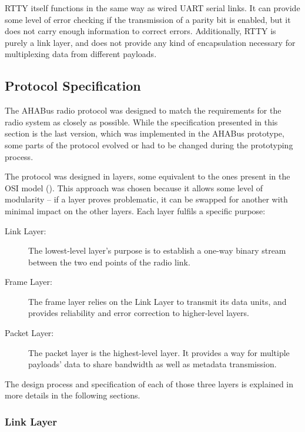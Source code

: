 RTTY itself functions in the same way as wired UART serial links. It can provide
some level of error checking if the transmission of a parity bit is enabled, but
it does not carry enough information to correct errors. Additionally, RTTY is
purely a link layer, and does not provide any kind of encapsulation necessary
for multiplexing data from different payloads.

\subsection{Protocol Specification}

The AHABus radio protocol was designed to match the requirements for the radio
system as closely as possible. While the specification presented in this section
is the last version, which was implemented in the AHABus prototype, some parts
of the protocol evolved or had to be changed during the prototyping process.

The protocol was designed in layers, some equivalent to the ones present in the
OSI model (\cite{Stallings1987}). This approach was chosen because it allows
some level of modularity – if a layer proves problematic, it can be swapped
for another with minimal impact on the other layers. Each layer fulfils a
specific purpose:


\begin{description}
\item[Link Layer:] The lowest-level layer's purpose is to establish a one-way
binary stream between the two end points of the radio link.

\item[Frame Layer:] The frame layer relies on the Link Layer to transmit its
data units, and provides reliability and error correction to higher-level 
layers.

\item[Packet Layer:] The packet layer is the highest-level layer. It provides
a way for multiple payloads' data to share bandwidth as well as metadata
transmission.
\end{description}

The design process and specification of each of those three layers is explained
in more details in the following sections.

\subsubsection{Link Layer}
\label{sssec:link-layer}

